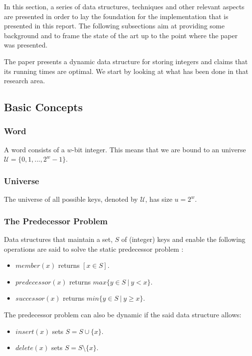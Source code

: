 In this section, a series of data structures, techniques and other relevant aspects are presented in order to lay the foundation for the implementation that is presented in this report. The following subsections aim at providing some background and to frame the state of the art up to the point where the  \cite{patrascu2014dynamic} paper was presented.

The \cite{patrascu2014dynamic} paper presents a dynamic data structure for storing integers and claims that its running times are optimal. We start by looking at what has been done in that research area.

\subsection{Basic Concepts}

\subsubsection{Word}
A word consists of a $w$-bit integer. This means that we are bound to an universe $\mathcal U = \{0, 1, ..., 2^{w}-1\}$.

\subsubsection{Universe}
The universe of all possible keys, denoted by $\mathcal U$, has size $u = 2^{w}$. 

\subsubsection{The Predecessor Problem}
Data structures that maintain a set, $S$ of (integer) keys and enable the following operations are said to solve the static predecessor problem \cite{beame1999optimal}:
\begin{itemize}
    \item
    $member(x)$ returns $[x \in S]$.
    \item
    $predecessor(x)$ returns $max\{y\in S\ |\ y < x\}$.
    \item
    $successor(x)$ returns $min\{y\in S\ |\ y \geq x\}$.
\end{itemize}

The predecessor problem can also be dynamic \cite{beame1999optimal} if the said data structure allows:
\begin{itemize}
    \item
    $insert(x)$ sets $S=S \cup \{x\}$.
    \item
    $delete(x)$ sets $S=S \setminus \{x\}$.
\end{itemize}

